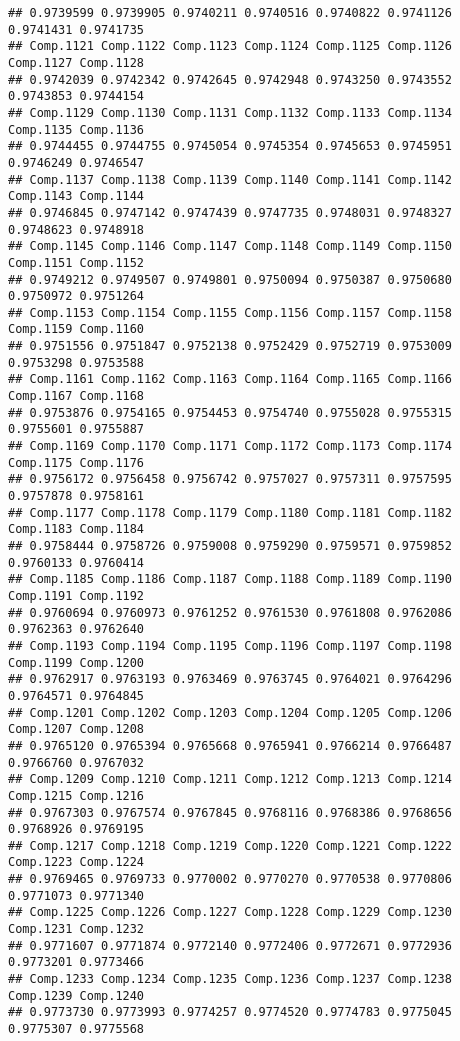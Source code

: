 \documentclass[
]{article}
\begin{document}
\begin{verbatim}
## 0.9739599 0.9739905 0.9740211 0.9740516 0.9740822 0.9741126 0.9741431 0.9741735 
## Comp.1121 Comp.1122 Comp.1123 Comp.1124 Comp.1125 Comp.1126 Comp.1127 Comp.1128 
## 0.9742039 0.9742342 0.9742645 0.9742948 0.9743250 0.9743552 0.9743853 0.9744154 
## Comp.1129 Comp.1130 Comp.1131 Comp.1132 Comp.1133 Comp.1134 Comp.1135 Comp.1136 
## 0.9744455 0.9744755 0.9745054 0.9745354 0.9745653 0.9745951 0.9746249 0.9746547 
## Comp.1137 Comp.1138 Comp.1139 Comp.1140 Comp.1141 Comp.1142 Comp.1143 Comp.1144 
## 0.9746845 0.9747142 0.9747439 0.9747735 0.9748031 0.9748327 0.9748623 0.9748918 
## Comp.1145 Comp.1146 Comp.1147 Comp.1148 Comp.1149 Comp.1150 Comp.1151 Comp.1152 
## 0.9749212 0.9749507 0.9749801 0.9750094 0.9750387 0.9750680 0.9750972 0.9751264 
## Comp.1153 Comp.1154 Comp.1155 Comp.1156 Comp.1157 Comp.1158 Comp.1159 Comp.1160 
## 0.9751556 0.9751847 0.9752138 0.9752429 0.9752719 0.9753009 0.9753298 0.9753588 
## Comp.1161 Comp.1162 Comp.1163 Comp.1164 Comp.1165 Comp.1166 Comp.1167 Comp.1168 
## 0.9753876 0.9754165 0.9754453 0.9754740 0.9755028 0.9755315 0.9755601 0.9755887 
## Comp.1169 Comp.1170 Comp.1171 Comp.1172 Comp.1173 Comp.1174 Comp.1175 Comp.1176 
## 0.9756172 0.9756458 0.9756742 0.9757027 0.9757311 0.9757595 0.9757878 0.9758161 
## Comp.1177 Comp.1178 Comp.1179 Comp.1180 Comp.1181 Comp.1182 Comp.1183 Comp.1184 
## 0.9758444 0.9758726 0.9759008 0.9759290 0.9759571 0.9759852 0.9760133 0.9760414 
## Comp.1185 Comp.1186 Comp.1187 Comp.1188 Comp.1189 Comp.1190 Comp.1191 Comp.1192 
## 0.9760694 0.9760973 0.9761252 0.9761530 0.9761808 0.9762086 0.9762363 0.9762640 
## Comp.1193 Comp.1194 Comp.1195 Comp.1196 Comp.1197 Comp.1198 Comp.1199 Comp.1200 
## 0.9762917 0.9763193 0.9763469 0.9763745 0.9764021 0.9764296 0.9764571 0.9764845 
## Comp.1201 Comp.1202 Comp.1203 Comp.1204 Comp.1205 Comp.1206 Comp.1207 Comp.1208 
## 0.9765120 0.9765394 0.9765668 0.9765941 0.9766214 0.9766487 0.9766760 0.9767032 
## Comp.1209 Comp.1210 Comp.1211 Comp.1212 Comp.1213 Comp.1214 Comp.1215 Comp.1216 
## 0.9767303 0.9767574 0.9767845 0.9768116 0.9768386 0.9768656 0.9768926 0.9769195 
## Comp.1217 Comp.1218 Comp.1219 Comp.1220 Comp.1221 Comp.1222 Comp.1223 Comp.1224 
## 0.9769465 0.9769733 0.9770002 0.9770270 0.9770538 0.9770806 0.9771073 0.9771340 
## Comp.1225 Comp.1226 Comp.1227 Comp.1228 Comp.1229 Comp.1230 Comp.1231 Comp.1232 
## 0.9771607 0.9771874 0.9772140 0.9772406 0.9772671 0.9772936 0.9773201 0.9773466 
## Comp.1233 Comp.1234 Comp.1235 Comp.1236 Comp.1237 Comp.1238 Comp.1239 Comp.1240 
## 0.9773730 0.9773993 0.9774257 0.9774520 0.9774783 0.9775045 0.9775307 0.9775568 

\end{verbatim}
\end{document}
